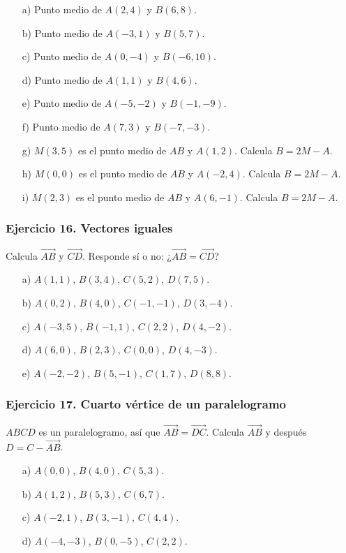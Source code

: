 \begin{enumerate}
    \item[a)] Punto medio de $A(2,4)$ y $B(6,8)$.
    \item[b)] Punto medio de $A(-3,1)$ y $B(5,7)$.
    \item[c)] Punto medio de $A(0,-4)$ y $B(-6,10)$.
    \item[d)] Punto medio de $A(1,1)$ y $B(4,6)$.
    \item[e)] Punto medio de $A(-5,-2)$ y $B(-1,-9)$.
    \item[f)] Punto medio de $A(7,3)$ y $B(-7,-3)$.
    \item[g)] $M(3,5)$ es el punto medio de $AB$ y $A(1,2)$.
    Calcula $B=2M-A$.
    \item[h)] $M(0,0)$ es el punto medio de $AB$ y $A(-2,4)$.
    Calcula $B=2M-A$.
    \item[i)] $M(2,3)$ es el punto medio de $AB$ y $A(6,-1)$.
    Calcula $B=2M-A$.
\end{enumerate}

\subsubsection*{Ejercicio 16. Vectores iguales}

Calcula $\overrightarrow{AB}$ y $\overrightarrow{CD}$. Responde sí o no:
¿$\overrightarrow{AB}=\overrightarrow{CD}$?

\begin{enumerate}
    \item[a)] $A(1,1)$, $B(3,4)$, $C(5,2)$, $D(7,5)$.
    \item[b)] $A(0,2)$, $B(4,0)$, $C(-1,-1)$, $D(3,-4)$.
    \item[c)] $A(-3,5)$, $B(-1,1)$, $C(2,2)$, $D(4,-2)$.
    \item[d)] $A(6,0)$, $B(2,3)$, $C(0,0)$, $D(4,-3)$.
    \item[e)] $A(-2,-2)$, $B(5,-1)$, $C(1,7)$, $D(8,8)$.
\end{enumerate}

\subsubsection*{Ejercicio 17. Cuarto vértice de un paralelogramo}

$ABCD$ es un paralelogramo, así que
$\overrightarrow{AB}=\overrightarrow{DC}$.
Calcula $\overrightarrow{AB}$ y después $D=C-\overrightarrow{AB}$.

\begin{enumerate}
    \item[a)] $A(0,0)$, $B(4,0)$, $C(5,3)$.
    \item[b)] $A(1,2)$, $B(5,3)$, $C(6,7)$.
    \item[c)] $A(-2,1)$, $B(3,-1)$, $C(4,4)$.
    \item[d)] $A(-4,-3)$, $B(0,-5)$, $C(2,2)$.
\end{enumerate}

